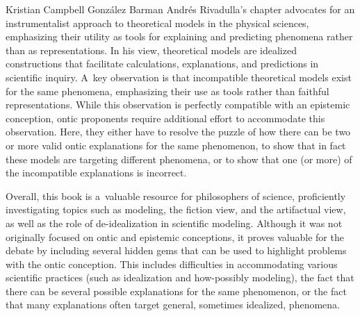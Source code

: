 \begin{recengenv}{Kristian Campbell González Barman}
\enlargethispage{1.5\baselineskip}
Andrés Rivadulla's chapter advocates for an instrumentalist approach to theoretical models in the physical sciences, emphasizing their utility as tools for explaining and predicting phenomena rather than as representations. In his view, theoretical models are idealized constructions that facilitate calculations, explanations, and predictions in scientific inquiry. A~key observation is that incompatible theoretical models exist for the same phenomena, emphasizing their use as tools rather than faithful representations. While this observation is perfectly compatible with an epistemic conception, ontic proponents require additional effort to accommodate this observation. Here, they either have to resolve the puzzle of how there can be two or more valid ontic explanations for the same phenomenon, to show that in fact these models are targeting different phenomena, or to show that one (or more) of the incompatible explanations is incorrect.

Overall, this book is a~valuable resource for philosophers of science, proficiently investigating topics such as modeling, the fiction view, and the artifactual view, as well as the role of de-idealization in scientific modeling. Although it was not originally focused on ontic and epistemic conceptions, it proves valuable for the debate by including several hidden gems that can be used to highlight problems with the ontic conception. This includes difficulties in accommodating various scientific practices (such as idealization and how-possibly modeling), the fact that there can be several possible explanations for the same phenomenon, or the fact that many explanations often target general, sometimes idealized, phenomena.




\end{recengenv}

